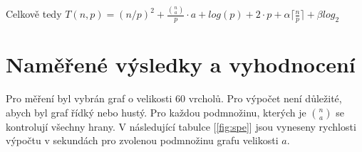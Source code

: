 \documentclass[a4paper,10pt]{report}
\begin{document}
\hspace{1cm}

Celkově tedy $T(n,p) = (n/p)^2 + \frac{{n \choose a}}{p}\cdot a + log(p) + 2 \cdot p + \alpha \lceil \frac{n}{p} \rceil + \beta log_{2}$

\section{Naměřené výsledky a vyhodnocení}

Pro měření byl vybrán graf o velikosti 60 vrcholů. Pro výpočet není důležité, abych byl graf řídký nebo hustý. Pro každou podmnožinu, kterých je ${n \choose a}$ se kontrolují všechny hrany. V následující tabulce [\ref{fig:spe}] jsou vyneseny rychlosti výpočtu v sekundách pro zvolenou podmnožinu grafu velikosti $a$.
\end{document}
